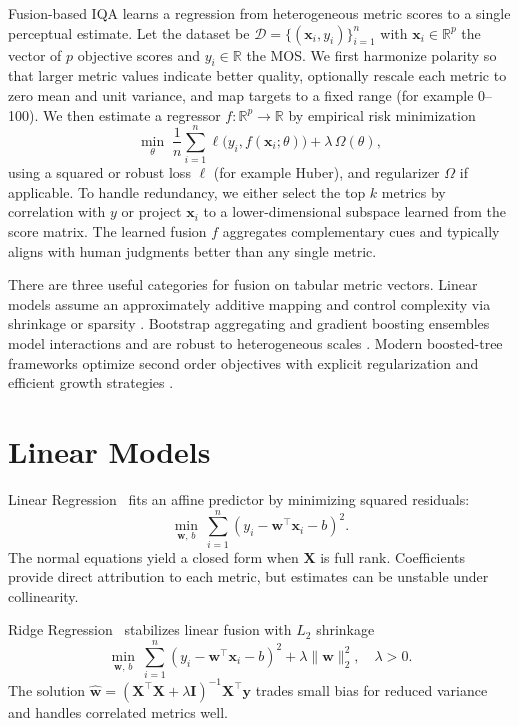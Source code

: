 
Fusion-based \ac{IQA} learns a regression from heterogeneous metric scores to a single perceptual estimate.
Let the dataset be \( \mathcal{D}=\{(\mathbf{x}_i,y_i)\}_{i=1}^{n} \) with \( \mathbf{x}_i \in \mathbb{R}^{p} \) the vector of \(p\) objective scores and \( y_i \in \mathbb{R} \) the \ac{MOS}.
We first harmonize polarity so that larger metric values indicate better quality, optionally rescale each metric to zero mean and unit variance, and map targets to a fixed range (for example 0--100).
We then estimate a regressor \( f:\mathbb{R}^{p}\to\mathbb{R} \) by empirical risk minimization
\[
  \min_{\theta}\; \frac{1}{n}\sum_{i=1}^{n} \ell\!\big(y_i, f(\mathbf{x}_i;\theta)\big) + \lambda\,\Omega(\theta),
\]
using a squared or robust loss \( \ell \) (for example Huber), and regularizer \( \Omega \) if applicable.
To handle redundancy, we either select the top \(k\) metrics by correlation with \(y\) or project \(\mathbf{x}_i\) to a lower-dimensional subspace learned from the score matrix.
The learned fusion \( f \) aggregates complementary cues and typically aligns with human judgments better than any single metric.

There are three useful categories for fusion on tabular metric vectors. Linear models assume an approximately additive mapping and control complexity via shrinkage or sparsity \cite{linearregression, ridgeregression, bayesianridge, elasticnet}. Bootstrap aggregating and gradient boosting ensembles model interactions and are robust to heterogeneous scales \cite{randomforest, ensembles, gradboost, histogram}. Modern boosted-tree frameworks optimize second order objectives with explicit regularization and efficient growth strategies \cite{xgboost, lightgbm, catboost}.

\section{Linear Models}\label{sec:linear}

Linear Regression~\cite{linearregression} fits an affine predictor by minimizing squared residuals:
\begin{equation}
\min_{\mathbf{w},\,b}\ \sum_{i=1}^{n}\left(y_i-\mathbf{w}^{\top}\mathbf{x}_i-b\right)^2.
\end{equation}
The normal equations yield a closed form when \(\mathbf{X}\) is full rank. Coefficients provide direct attribution to each metric, but estimates can be unstable under collinearity.

Ridge Regression~\cite{ridgeregression} stabilizes linear fusion with \(L_2\) shrinkage
\begin{equation}
\min_{\mathbf{w},\,b}\ \sum_{i=1}^{n}\left(y_i-\mathbf{w}^{\top}\mathbf{x}_i-b\right)^2+\lambda\|\mathbf{w}\|_2^2,\quad \lambda>0.
\end{equation}
The solution \(\hat{\mathbf{w}}=(\mathbf{X}^{\top}\mathbf{X}+\lambda\mathbf{I})^{-1}\mathbf{X}^{\top}\mathbf{y}\) trades small bias for reduced variance and handles correlated metrics well.


